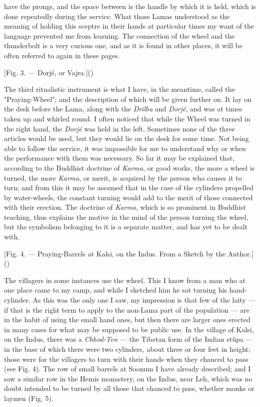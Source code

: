 \documentclass[a4paper, 11pt, oneside, polutonikogreek, english]{article}
\begin{document}
have the prongs, and the space between is the handle by which it is held, which is done repeatedly during the service. What those Lamas understood as the meaning of holding this sceptre in their hands at particular times my want of the language prevented me from learning. The connection of the wheel and the thunderbolt is a very curious one, and as it is found in other places, it will be often referred to again in these pages.

[Fig. 3. --- Dorjé, or Vajra.]()

The third ritualistic instrument is what I have, in the meantime, called the "Praying-Wheel"; and the description of which will be given further on. It lay on the desk before the Lama, along with the \emph{Drilbu} and \emph{Dorjé}, and was at times taken up and whirled round. I often noticed that while the Wheel was turned in the right hand, the \emph{Dorjé} was held in the left. Sometimes none of the three articles would be used, but they would lie on the desk for some time. Not being able to follow the service, it was impossible for me to understand why or when the performance with them was necessary. So far it may be explained that, according to the Buddhist doctrine of \emph{Karma}, or good works, the more a wheel is turned, the more \emph{Karma}, or merit, is acquired by the person who causes it to turn; and from this it may be assumed that in the case of the cylinders propelled by water-wheels, the constant turning would add to the merit of those connected with their erection. The doctrine of \emph{Karma}, which is so prominent in Buddhist teaching, thus explains the motive in the mind of the person turning the wheel, but the symbolism belonging to it is a separate matter, and has yet to be dealt with.

[Fig. 4. --- Praying-Barrels at Kalsi, on the Indus. From a Sketch by the Author.]()

The villagers in some instances use the wheel. This I know from a man who at one place came to my camp, and while I sketched him he sat turning his hand-cylinder. As this was the only one I saw, my impression is that few of the laity --- if that is the right term to apply to the non-Lama part of the population --- are in the habit of using the small hand ones, but then there are larger ones erected in many cases for what may be supposed to be public use. In the village of Kalsi, on the Indus, there was a \emph{Chhod-Ten} --- the Tibetan form of the Indian stûpa --- in the base of which there were two cylinders, about three or four feet in height; those were for the villagers to turn with their hands when they chanced to pass (see Fig. 4). The row of small barrels at Soonum I have already described; and I saw a similar row in the Hemis monastery, on the Indus, near Leh, which was no doubt intended to be turned by all those that chanced to pass, whether monks or laymen (Fig. 5).
\end{document}
